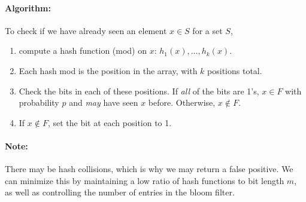 \documentclass{report}
\renewcommand{\it}[1]{\textit{{#1}}}
\begin{document}
\paragraph{Algorithm:} To check if we have already seen an element $x \in S$ for
a set $S$,
\begin{enumerate}[label=(\arabic*)]
    \item compute a hash function (mod) on $x$: $h_1(x), \ldots, h_k(x)$.
    \item Each hash mod is the position in the array, with $k$ positions total.
    \item Check the bits in each of these positions. If \it{all} of the bits
        are 1's, $x \in F$ with probability $p$ and \it{may} have seen $x$
        before. Otherwise, $x \not\in F$.
    \item If $x \not\in F$, set the bit at each position to 1.
\end{enumerate}

\paragraph{Note:} There may be hash collisions, which is why we may return a
false positive. We can minimize this by maintaining a low ratio of hash
functions to bit length $m$, as well as controlling the number of entries in the
bloom filter.
\end{document}
